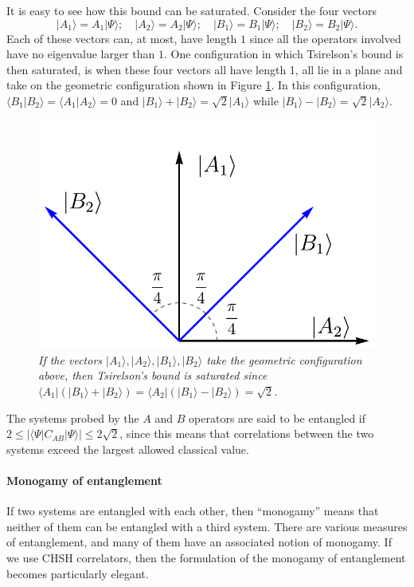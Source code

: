 \documentclass[12pt]{article}
\newcommand{\be}{\begin{equation}}
\newcommand{\ee}{\end{equation}}
\begin{document}
It is easy to see how this bound can be saturated. Consider the four vectors 
\be
|A_1 \rangle = A_1 | \Psi \rangle; \quad  |A_2 \rangle = A_2 | \Psi \rangle; \quad  |B_1 \rangle = B_1 | \Psi \rangle; \quad  |B_2 \rangle = B_2 | \Psi \rangle.
\ee
Each of these vectors can, at most, have length $1$ since all the operators involved have no eigenvalue larger than $1$.   One configuration in which Tsirelson's bound is then saturated, is  when these four vectors all have length 1, all lie in a plane and take on the geometric configuration shown in Figure \ref{figcirelson}. In this configuration, $\langle B_1 | B_2 \rangle = \langle A_1 | A_2 \rangle = 0$ and  $|B_1 \rangle + |B_2 \rangle = \sqrt{2} |A_1 \rangle$ while $|B_1 \rangle - |B_2 \rangle = \sqrt{2} |A_2 \rangle$.
\begin{figure}[!ht]
\begin{center}
\includegraphics[height=0.3\textheight]{cirelsonplot.pdf}
\caption{\em If the vectors $|A_1 \rangle, |A_2 \rangle, |B_1 \rangle, |B_2 \rangle$ take the geometric configuration above, then Tsirelson's bound is saturated since $\langle A_1 | (|B_1 \rangle + |B_2 \rangle)  = \langle A_2| (|B_1 \rangle - |B_2 \rangle ) = \sqrt{2}$. \label{figcirelson}}
\end{center}
\end{figure}

The systems probed by the $A$ and $B$ operators are said to be entangled if $2 \leq |\langle \Psi | C_{AB} |\Psi  \rangle| \leq 2 \sqrt{2}$, since this means that correlations between the two systems exceed the largest allowed classical value. 



\paragraph{\bf Monogamy of entanglement \\}
If  two systems are entangled with each other, then ``monogamy'' means that neither of them can be entangled with a third system. There are various measures of entanglement, and many of them have an associated notion of monogamy. If we use CHSH
correlators, then the formulation of the monogamy of entanglement becomes particularly elegant. 
\end{document}
